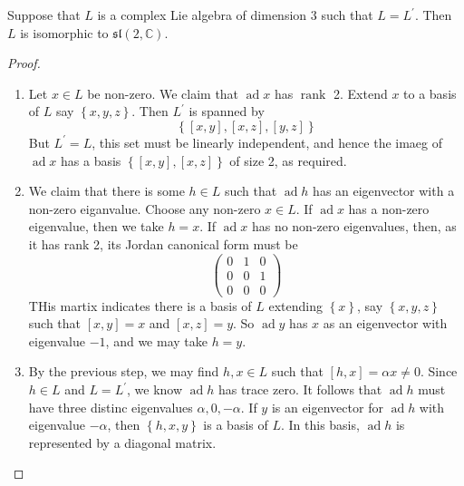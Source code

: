 \documentclass[../main.tex]{subfiles}
\begin{document}
\begin{theorem}{}{}
    Suppose that \(  L  \) is a complex Lie algebra of dimension \(  3  \) such that \(  L= L^{\prime}   \). Then \(  L  \) is isomorphic to \(  \mathfrak{sl}\left( 2,\mathbb{C}  \right)   \).     
\end{theorem}
\begin{proof}
    \begin{enumerate}
        \item Let \(  x \in L  \) be non-zero. We claim that \(  \operatorname{ad}x  \)   has \(  \operatorname{rank}  \) 2. Extend \(  x  \) to a basis of \(  L  \) say \(  \left\{ x,y,z \right\}  \). Then \(  L^{\prime}   \) is spanned by \[
        \left\{ \left[ x,y \right],\left[ x,z \right], \left[ y,z \right]    \right\}
        \]     But \(  L^{\prime} = L  \), this set must be linearly independent, and hence the imaeg of \(  \operatorname{ad}x  \) has  a basis \(  \left\{ \left[ x,y \right],\left[ x,z \right]   \right\}   \) of size 2, as required.
        \item We claim that there is some \(  h\in L  \) such that \(  \operatorname{ad}h  \) has an eigenvector with a non-zero eiganvalue. Choose any non-zero \(  x \in L  \). If \(  \operatorname{ad}x  \) has a non-zero eigenvalue, then we take \(  h= x  \). If \(  \operatorname{ad}x  \)          has no non-zero eigenvalues, then, as it has rank 2, its Jordan canonical form must be \[
        \begin{pmatrix} 
            0&1&0\\ 
             0&0&1\\ 
              0&0&0 
        \end{pmatrix} 
        \] THis martix indicates there is a basis of \(  L  \) extending \(  \left\{ x \right\}  \), say \(  \left\{ x,y,z \right\}  \) such that \(  \left[ x,y \right]= x   \) and \(  \left[ x,z \right]= y   \). So \(  \operatorname{ad}y  \)       has \(  x  \) as an eigenvector with eigenvalue \(  -1  \), and we may take \(  h= y  \).
        
        \item By the previous step, we may find \(  h,x \in L  \) such that \(  [h,x]= \alpha x\neq 0  \). Since \(  h \in L  \) and \(  L= L^{\prime}   \), we know \(  \operatorname{ad}h  \) has trace zero. It follows that \(  \operatorname{ad}h  \) must have three distinc eigenvalues \(  \alpha ,0,-\alpha   \). If \(  y  \) is an eigenvector for \(  \operatorname{ad}h  \) with eigenvalue \(  -\alpha   \), then \(  \left\{ h,x,y \right\}  \) is a basis of \(  L  \). In this basis, \(  \operatorname{ad}h  \) is represented by a diagonal matrix.
        

\end{enumerate}
\end{proof}
\end{document}
